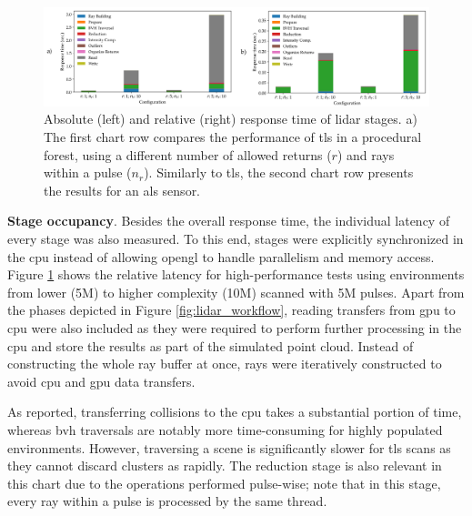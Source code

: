 \begin{figure}
    \centering
    \includegraphics[width=\linewidth]{figs/lidar_simulation/lidar_response_time_stage.png}
	\caption{Absolute (left) and relative (right) response time of \acrshort{lidar} stages. a) The first chart row compares the performance of \acrshort{tls} in a procedural forest, using a different number of allowed returns ($r$) and rays within a pulse ($n_r$). Similarly to \acrshort{tls}, the second chart row presents the results for an \acrshort{als} sensor.}
	\label{fig:lidar_response_time_chart}
\end{figure}

\textbf{Stage occupancy}. Besides the overall response time, the individual latency of every stage was also measured. To this end, stages were explicitly synchronized in the \acrshort{cpu} instead of allowing \acrshort{opengl} to handle parallelism and memory access. Figure \ref{fig:lidar_response_time_chart} shows the relative latency for high-performance tests using environments from lower (5M) to higher complexity (10M) scanned with 5M pulses. Apart from the phases depicted in Figure \ref{fig:lidar_workflow}, reading transfers from \acrshort{gpu} to \acrshort{cpu} were also included as they were required to perform further processing in the \acrshort{cpu} and store the results as part of the simulated point cloud. Instead of constructing the whole ray buffer at once, rays were iteratively constructed to avoid \acrshort{cpu} and \acrshort{gpu} data transfers.

As reported, transferring collisions to the \acrshort{cpu} takes a substantial portion of time, whereas \acrshort{bvh} traversals are notably more time-consuming for highly populated environments. However, traversing a scene is significantly slower for \acrshort{tls} scans as they cannot discard clusters as rapidly. The reduction stage is also relevant in this chart due to the operations performed pulse-wise; note that in this stage, every ray within a pulse is processed by the same thread. 

\newcommand{\datasetImageHeight}{-.06\totalheight}
\newcommand{\datasetImageSize}{1.4cm}
\newcommand{\lidarCoreLabel}{ToF Solver}


